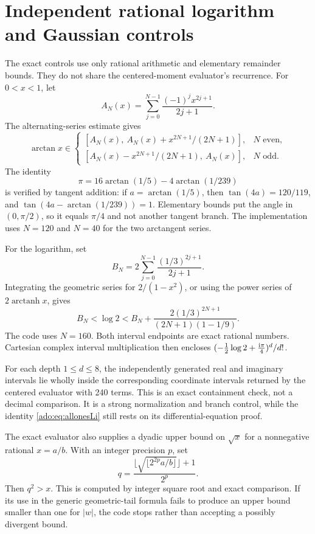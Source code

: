 \section{Independent rational logarithm and Gaussian controls}
\label{ado:app:controls}
The exact controls use only rational arithmetic and elementary remainder
bounds. They do not share the centered-moment evaluator's recurrence.
For $0<x<1$, let
\[
 A_N(x)=\sum_{j=0}^{N-1}\frac{(-1)^jx^{2j+1}}{2j+1}.
\]
The alternating-series estimate gives
\[
 \arctan x\in
 \begin{cases}
 [A_N(x),\ A_N(x)+x^{2N+1}/(2N+1)],&N\text{ even},\\
 [A_N(x)-x^{2N+1}/(2N+1),\ A_N(x)],&N\text{ odd}.
 \end{cases}
\]
The identity
\begin{equation}\label{ado:eq:machin}
 \pi=16\arctan(1/5)-4\arctan(1/239)
\end{equation}
is verified by tangent addition: if $a=\arctan(1/5)$, then
$\tan(4a)=120/119$, and
$\tan(4a-\arctan(1/239))=1$. Elementary bounds put the angle in
$(0,\pi/2)$, so it equals $\pi/4$ and not another tangent branch.
The implementation uses $N=120$ and $N=40$ for the two arctangent
series.

For the logarithm, set
\[
 B_N=2\sum_{j=0}^{N-1}\frac{(1/3)^{2j+1}}{2j+1}.
\]
Integrating the geometric series for $2/(1-x^2)$, or using the
power series of $2\operatorname{arctanh}x$, gives
\begin{equation}\label{ado:eq:log2interval}
 B_N<\log2<
 B_N+\frac{2(1/3)^{2N+1}}{(2N+1)(1-1/9)}.
\end{equation}
The code uses $N=160$. Both interval endpoints are exact rational
numbers. Cartesian complex interval multiplication then encloses
$(-\tfrac12\log2+\tfrac{\mathrm{i}\pi}{4})^d/d!$.

For each depth $1\le d\le8$, the independently generated real and
imaginary intervals lie wholly inside the corresponding coordinate
intervals returned by the centered evaluator with 240 terms. This is
an exact containment check, not a decimal comparison. It is a strong
normalization and branch control, while the identity
\eqref{ado:eq:allonesLi} still rests on its differential-equation proof.

The exact evaluator also supplies a dyadic upper bound on $\sqrt{x}$
for a nonnegative rational $x=a/b$. With an integer precision $p$, set
\[
 q=\frac{\lfloor\sqrt{\lfloor 2^{2p}a/b\rfloor}\rfloor+1}{2^p}.
\]
Then $q^2>x$. This is computed by integer square root and exact
comparison. If its use in the generic geometric-tail formula fails to
produce an upper bound smaller than one for $|w|$, the code stops
rather than accepting a possibly divergent bound.

